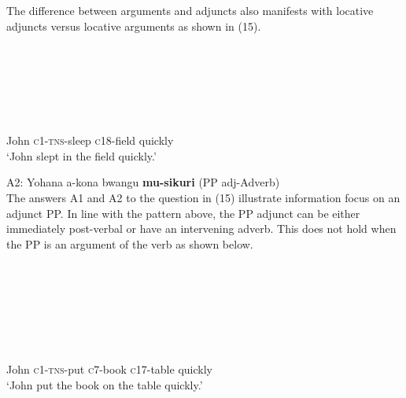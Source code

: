 \documentclass[output=paper]{langsci/langscibook}
\begin{document}
  The difference between arguments and adjuncts also manifests with locative adjuncts versus locative arguments as shown in (15).  

\begin{listWWviiiNumxlileveli}
\item \ea\label{ex:}
\\
\ea\label{ex:}
\\
\ea\label{ex:}
\\
\ea\label{ex:}
\\
\ea\label{ex:}
\\
\end{listWWviiiNumxlileveli}
       John     \textsc{c1-tns}{}-sleep  \textsc{c}18-field   quickly   \\
\glt   ‘John slept in the field quickly.’
\z

\gll A2:  Yohana  a-kona    bwangu  \textbf{mu-sikuri}  (PP adj-Adverb)\\
The answers A1 and A2 to the question in (15) illustrate information focus on an adjunct PP. In line with the pattern above, the PP adjunct can be either immediately post-verbal or have an intervening adverb. This does not hold when the PP is an argument of the verb as shown below.  

\begin{listWWviiiNumxlileveli}
\item \ea\label{ex:}
\\
\ea\label{ex:}
\\
\ea\label{ex:}
\\
\ea\label{ex:}
\\
\end{listWWviiiNumxlileveli}
\begin{listWWviiiNumxlileveli}
\ea\label{ex:}
\\
\end{listWWviiiNumxlileveli}
       John       \textsc{c1-tns-}put  \textsc{c}7-book   \textsc{c}17-table   quickly\\
\glt   ‘John put the book on the table quickly.’   
\z
\end{document}
